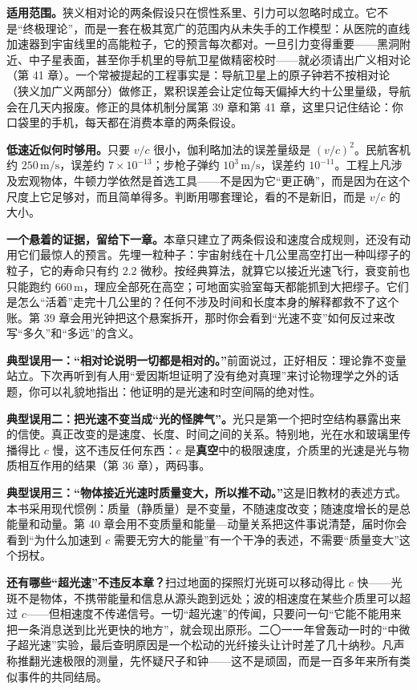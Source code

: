 
\textbf{适用范围。}狭义相对论的两条假设只在惯性系里、引力可以忽略时成立。它不是“终极理论”，而是一套在极其宽广的范围内从未失手的工作模型：从医院的直线加速器到宇宙线里的高能粒子，它的预言每次都对。一旦引力变得重要——黑洞附近、中子星表面，甚至你手机里的导航卫星做精密校时——就必须请出广义相对论（第 41 章）。一个常被提起的工程事实是：导航卫星上的原子钟若不按相对论（狭义加广义两部分）做修正，累积误差会让定位每天偏掉大约十公里量级，导航会在几天内报废。修正的具体机制分属第 39 章和第 41 章，这里只记住结论：你口袋里的手机，每天都在消费本章的两条假设。

\textbf{低速近似何时够用。}只要 \(v/c\) 很小，伽利略加法的误差量级是 \((v/c)^{2}\)。民航客机约 \(250\,\mathrm{m/s}\)，误差约 \(7\times10^{-13}\)；步枪子弹约 \(10^{3}\,\mathrm{m/s}\)，误差约 \(10^{-11}\)。工程上凡涉及宏观物体，牛顿力学依然是首选工具——不是因为它“更正确”，而是因为在这个尺度上它足够对，而且简单得多。判断用哪套理论，看的不是新旧，而是 \(v/c\) 的大小。

\textbf{一个悬着的证据，留给下一章。}本章只建立了两条假设和速度合成规则，还没有动用它们最惊人的预言。先埋一粒种子：宇宙射线在十几公里高空打出一种叫缪子的粒子，它的寿命只有约 \(2.2\) 微秒。按经典算法，就算它以接近光速飞行，衰变前也只能跑约 \(660\,\mathrm{m}\)，理应全部死在高空；可地面实验室每天都能抓到大把缪子。它们是怎么“活着”走完十几公里的？任何不涉及时间和长度本身的解释都救不了这个账。第 39 章会用光钟把这个悬案拆开，那时你会看到“光速不变”如何反过来改写“多久”和“多远”的含义。

\textbf{典型误用一：“相对论说明一切都是相对的。”}前面说过，正好相反：理论靠不变量站立。下次再听到有人用“爱因斯坦证明了没有绝对真理”来讨论物理学之外的话题，你可以礼貌地指出：他证明的是光速和时空间隔的绝对性。

\textbf{典型误用二：把光速不变当成“光的怪脾气”。}光只是第一个把时空结构暴露出来的信使。真正改变的是速度、长度、时间之间的关系。特别地，光在水和玻璃里传播得比 \(c\) 慢，这不违反任何东西：\(c\) 是\textbf{真空}中的极限速度，介质里的光速是光与物质相互作用的结果（第 36 章），两码事。

\textbf{典型误用三：“物体接近光速时质量变大，所以推不动。”}这是旧教材的表述方式。本书采用现代惯例：质量（静质量）是不变量，不随速度改变；随速度增长的是总能量和动量。第 40 章会用不变质量和能量—动量关系把这件事说清楚，届时你会看到“为什么加速到 \(c\) 需要无穷大的能量”有一个干净的表述，不需要“质量变大”这个拐杖。

\textbf{还有哪些“超光速”不违反本章？}扫过地面的探照灯光斑可以移动得比 \(c\) 快——光斑不是物体，不携带能量和信息从源头跑到远处；波的相速度在某些介质里可以超过 \(c\)——但相速度不传递信号。一切“超光速”的传闻，只要问一句“它能不能用来把一条消息送到比光更快的地方”，就会现出原形。二〇一一年曾轰动一时的“中微子超光速”实验，最后查明原因是一个松动的光纤接头让计时差了几十纳秒。凡声称推翻光速极限的测量，先怀疑尺子和钟——这不是顽固，而是一百多年来所有类似事件的共同结局。


